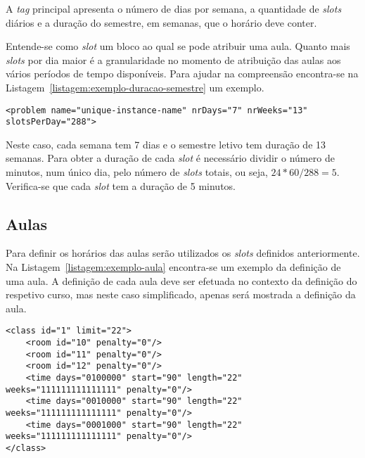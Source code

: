 A \textit{tag} principal apresenta o número de dias por semana, a quantidade de \textit{slots} diários e a duração do semestre, em semanas, que o horário deve conter.

Entende-se como \textit{slot} um bloco ao qual se pode atribuir uma aula. Quanto mais \textit{slots} por dia maior é a granularidade no momento de atribuição das aulas aos vários períodos de tempo disponíveis. Para ajudar na compreensão encontra-se na Listagem~\ref{listagem:exemplo-duracao-semestre} um exemplo.

\begin{minipage}[c]{\linewidth}
\begin{lstlisting}[caption={Exemplo da definição da duração do semestre.}, label={listagem:exemplo-duracao-semestre}]
<problem name="unique-instance-name" nrDays="7" nrWeeks="13" slotsPerDay="288">
\end{lstlisting}
\end{minipage}

Neste caso, cada semana tem 7 dias e o semestre letivo tem duração de 13 semanas. Para obter a duração de cada \textit{slot} é necessário dividir o número de minutos, num único dia, pelo número de \textit{slots} totais, ou seja, $24*60/288 = 5$. Verifica-se que cada \textit{slot} tem a duração de 5 minutos.

\subsection{Aulas}

Para definir os horários das aulas serão utilizados os \textit{slots} definidos anteriormente. Na Listagem~\ref{listagem:exemplo-aula} encontra-se um exemplo da definição de uma aula. A definição de cada aula deve ser efetuada no contexto da definição do respetivo curso, mas neste caso simplificado, apenas será mostrada a definição da aula.

\begin{minipage}[c]{\linewidth}
\begin{lstlisting}[caption={Exemplo da definição de uma aula.}, label={listagem:exemplo-aula}]
<class id="1" limit="22">
    <room id="10" penalty="0"/>
    <room id="11" penalty="0"/>
    <room id="12" penalty="0"/>
    <time days="0100000" start="90" length="22" weeks="111111111111111" penalty="0"/>
    <time days="0010000" start="90" length="22" weeks="111111111111111" penalty="0"/>
    <time days="0001000" start="90" length="22" weeks="111111111111111" penalty="0"/>
</class>
\end{lstlisting}
\end{minipage}

